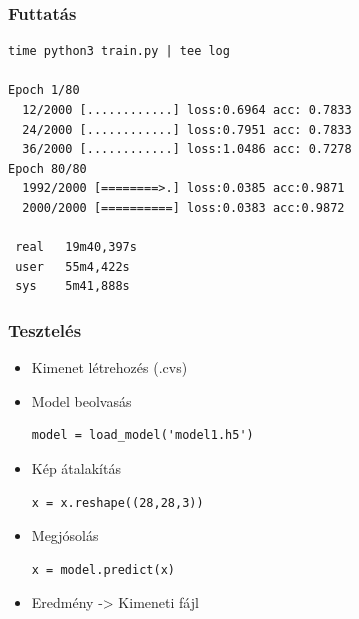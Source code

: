 \documentclass{beamer}
\begin{document}
\begin{frame}[fragile]
\frametitle{Futtatás}
\begin{lstlisting}
time python3 train.py | tee log

Epoch 1/80
  12/2000 [............] loss:0.6964 acc: 0.7833
  24/2000 [............] loss:0.7951 acc: 0.7833
  36/2000 [............] loss:1.0486 acc: 0.7278
Epoch 80/80
  1992/2000 [========>.] loss:0.0385 acc:0.9871
  2000/2000 [==========] loss:0.0383 acc:0.9872
  
 real	19m40,397s
 user	55m4,422s
 sys	5m41,888s
\end{lstlisting}

\end{frame}

\begin{frame}[fragile]
\frametitle{Tesztelés}
\begin{itemize}
\item Kimenet létrehozés (.cvs) 
\item Model beolvasás
\begin{lstlisting}
model = load_model('model1.h5')
\end{lstlisting}
\item Kép átalakítás
\begin{lstlisting}
x = x.reshape((28,28,3))
\end{lstlisting}
\item Megjósolás
\begin{lstlisting}
x = model.predict(x)
\end{lstlisting}
\item Eredmény -> Kimeneti fájl
\end{itemize}
\end{frame}
\end{document}
